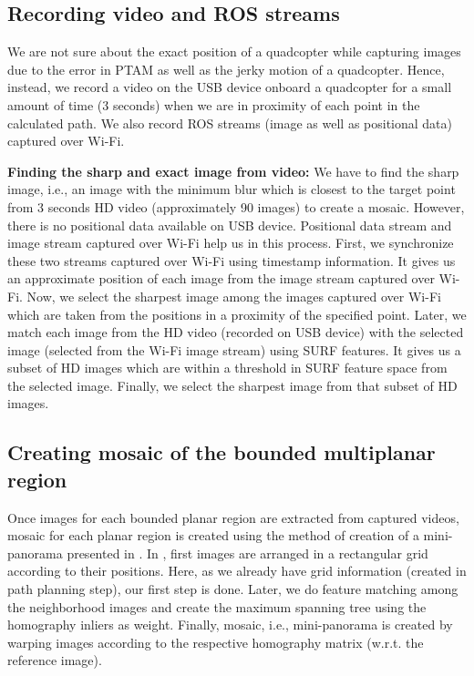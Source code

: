 \subsection{Recording video and ROS streams}
 We are not sure about the exact position of a quadcopter while capturing
 images due to the error in PTAM as well as the jerky motion of a quadcopter. 
 Hence, instead, we record a video on the USB device onboard a quadcopter for a
 small amount of time (3 seconds) when we are in proximity of each point in the calculated path. We
also record ROS streams (image as well as positional data) captured over Wi-Fi.

\noindent\textbf{Finding the sharp and exact image from video:} We have to find
the sharp image, i.e., an image with the minimum blur which is closest to the
target point from 3 seconds HD video (approximately 90 images) to create a
mosaic. However, there is no positional data available on USB device. Positional
data stream and image stream captured over Wi-Fi help us in this process. First, we synchronize these
two streams captured over Wi-Fi using timestamp information. It gives us an
approximate position of each image from the image stream captured over Wi-Fi.
Now, we select the sharpest image among the images captured over Wi-Fi which
are taken from the positions in a proximity of the specified point. Later,
we match each image from the HD video (recorded on USB device) with the
selected image (selected from the Wi-Fi image stream) using SURF features. It
gives us a subset of HD images which are within a threshold in SURF\cite{Bay} feature
space from the selected image. Finally, we select the sharpest image from that subset of HD images.

\subsection{Creating mosaic of the bounded multiplanar region}
Once images for each bounded planar region are extracted from captured
videos, mosaic for each planar region is created using the method of creation of
a mini-panorama presented in \cite{Prasad16}. In \cite{Prasad16}, first images
are arranged in a rectangular grid according to their positions. Here, as we
already have grid information (created in path planning step), our first step
is done. Later, we do feature matching among the neighborhood images and create
the maximum spanning tree using the homography inliers as weight.  Finally,
mosaic, i.e., mini-panorama is created by warping images according to the
respective homography matrix (w.r.t. the  reference image).


